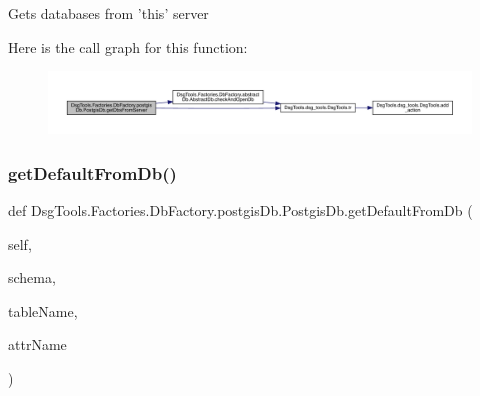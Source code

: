 \begin{DoxyVerb}Gets databases from 'this' server
\end{DoxyVerb}
 Here is the call graph for this function\+:
\nopagebreak
\begin{figure}[H]
\begin{center}
\leavevmode
\includegraphics[width=350pt]{class_dsg_tools_1_1_factories_1_1_db_factory_1_1postgis_db_1_1_postgis_db_a0cbf4eb6f5c3e387469e5ee8113b1319_cgraph}
\end{center}
\end{figure}
\mbox{\label{class_dsg_tools_1_1_factories_1_1_db_factory_1_1postgis_db_1_1_postgis_db_a9a7e50f5c1adba49a717f5d8834d5d3d}} 
\subsubsection{\texorpdfstring{get\+Default\+From\+Db()}{getDefaultFromDb()}}
{\footnotesize\ttfamily def Dsg\+Tools.\+Factories.\+Db\+Factory.\+postgis\+Db.\+Postgis\+Db.\+get\+Default\+From\+Db (\begin{DoxyParamCaption}\item[{}]{self,  }\item[{}]{schema,  }\item[{}]{table\+Name,  }\item[{}]{attr\+Name }\end{DoxyParamCaption})}

